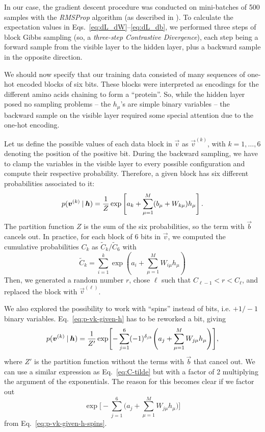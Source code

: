 \documentclass[prl, twocolumn]{revtex4-2}
\begin{document}
In our case, the gradient descent procedure was conducted on mini-batches of 500 samples with the \emph{RMSProp} algorithm (as described in \cite{Mehta2019}). To calculate the expectation values in Eqs.~\eqref{eq:dL_dW}–\eqref{eq:dL_db}, we performed three steps of block Gibbs sampling (so, a \emph{three-step Contrastive Divergence}), each step being a forward sample from the visible layer to the hidden layer, plus a backward sample in the opposite direction.

We should now specify that our training data consisted of many sequences of one-hot encoded blocks of six bits. These blocks were interpreted as encodings for the different amino acids chaining to form a “protein”. So, while the hidden layer posed no sampling problems – the $h_\mu$’s are simple binary variables – the backward sample on the visible layer required some special attention due to the one-hot encoding.

Let us define the possible values of each data block in $\vec{v}$ as $\vec{v}^{(k)}$, with $k = 1, \dots, 6$ denoting the position of the positive bit. During the backward sampling, we have to clamp the variables in the visible layer to every possible configuration and compute their respective probability. Therefore, a given block has six different probabilities associated to it:
\begin{equation}
    p(\bm{v}^{(k)} \:\vert\: \bm{h}) = \frac{1}{Z} \exp\left[a_k + \sum_{\mu = 1}^{M} (b_\mu + W_{k\mu}) h_\mu \right].
    \label{eq:p-vk-given-h}
\end{equation}
The partition function $Z$ is the sum of the six probabilities, so the term with $\vec{b}$ cancels out. In practice, for each block of 6 bits in $\vec{v}$, we computed the cumulative probabilities $C_k$ as $\tilde{C}_k / \tilde{C}_6$ with
\begin{equation}
    \tilde{C}_k = \sum_{i = 1}^{k} \exp\left(a_i + \sum_{\mu = 1}^{M} W_{i\mu} h_\mu\right)
    \label{eq:C-tilde}
\end{equation}
Then, we generated a random number $r$, chose $\ell$ such that $C_{\ell-1}<r<C_\ell$, and replaced the block with $\vec{v}^{(\ell)}$. 

We also explored the possibility to work with “spins” instead of bits, i.e. $+1/-1$ binary variables. Eq.~\eqref{eq:p-vk-given-h} has to be reworked a bit, giving
\begin{equation}
    p(\bm{v}^{(k)} \:\vert\: \bm{h}) = \frac{1}{Z'}
    \exp\Biggl[
        - \sum_{j = 1}^{6} (-1)^{\delta_{jk}} \Biggl(a_j + \sum_{\mu = 1}^{M} W_{j\mu} h_\mu\Biggr)
    \Biggr],
    \label{eq:p-vk-given-h-spins}
\end{equation}
where $Z'$ is the partition function without the terms with $\vec{b}$ that cancel out. We can use a similar expression as Eq.~\eqref{eq:C-tilde} but with a factor of 2 multiplying the argument of the exponentials. The reason for this becomes clear if we factor out
\begin{equation}
    \exp\Biggl[-\sum_{j = 1}^{6} \Biggl(a_j + \sum_{\mu = 1}^{M} W_{j\mu} h_\mu\Biggr)\Biggr]
\end{equation}
from Eq.~\eqref{eq:p-vk-given-h-spins}.
\end{document}
